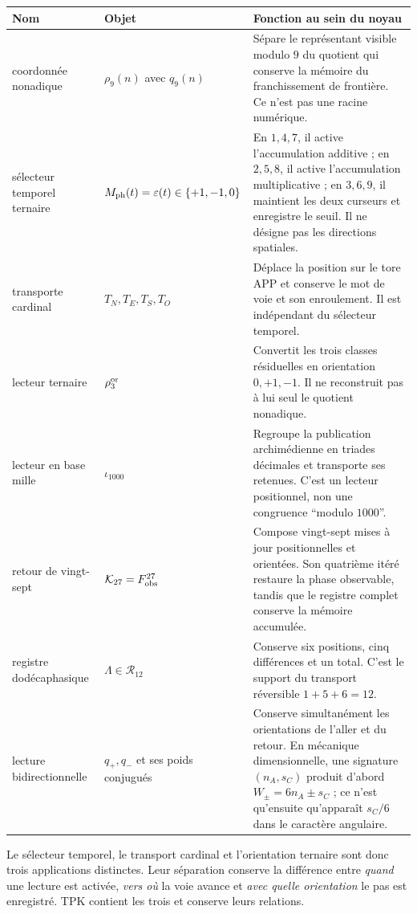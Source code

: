 \begin{longtable}{@{}>{\raggedright\arraybackslash}p{}
>{\raggedright\arraybackslash}p{}
>{\raggedright\arraybackslash}p{}@{}}
\toprule
Nom&Objet&Fonction au sein du noyau\\\midrule
\endhead
coordonnée nonadique&
\(\rho_9(n)\) avec \(q_9(n)\)&
Sépare le représentant visible modulo \(9\) du quotient qui conserve la
mémoire du franchissement de frontière. Ce n'est pas une racine numérique.\\
sélecteur temporel ternaire&
\(M_{\rm ph}(t)=\varepsilon(t)\in\{+1,-1,0\}\)&
En \(1,4,7\), il active l'accumulation additive ; en \(2,5,8\), il active
l'accumulation multiplicative ; en \(3,6,9\), il maintient les deux curseurs et enregistre le seuil.
Il ne désigne pas les directions spatiales.\\
transporte cardinal&
\(T_N,T_E,T_S,T_O\)&
Déplace la position sur le tore APP et conserve le mot de voie et son
enroulement. Il est indépendant du sélecteur temporel.\\
lecteur ternaire&
\(\rho_3^{\rm or}\)&
Convertit les trois classes résiduelles en orientation
\(0,+1,-1\). Il ne reconstruit pas à lui seul le quotient nonadique.\\
lecteur en base mille&
\(\iota_{1000}\)&
Regroupe la publication archimédienne en triades décimales et transporte ses
retenues. C'est un lecteur positionnel, non une congruence ``modulo \(1000\)''.\\
retour de vingt-sept&
\(\mathcal K_{27}=F_{\rm obs}^{27}\)&
Compose vingt-sept mises à jour positionnelles et orientées. Son quatrième
itéré restaure la phase observable, tandis que le registre complet conserve
la mémoire accumulée.\\
registre dodécaphasique&
\(\Lambda\in\mathcal R_{12}\)&
Conserve six positions, cinq différences et un total. C'est le support du
transport réversible \(1+5+6=12\).\\
lecture bidirectionnelle&
\(q_+,q_-\) et ses poids conjugués&
Conserve simultanément les orientations de l'aller et du retour. En mécanique
dimensionnelle, une signature \((n_A,s_C)\) produit d'abord
\(W_\pm=6n_A\pm s_C\) ; ce n'est qu'ensuite qu'apparaît
\(s_C/6\) dans le caractère angulaire.\\
\bottomrule
\end{longtable}

Le sélecteur temporel, le transport cardinal et l'orientation ternaire sont
donc trois applications distinctes. Leur séparation conserve la différence entre
\emph{quand} une lecture est activée, \emph{vers où} la voie avance et
\emph{avec quelle orientation} le pas est enregistré. TPK contient les trois et
conserve leurs relations.


